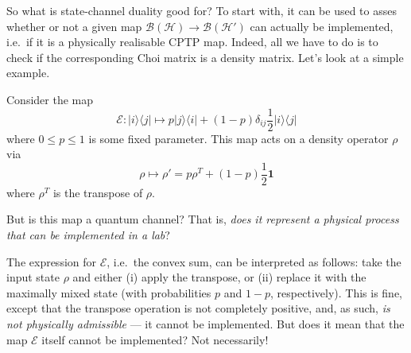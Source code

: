 \documentclass[fleqn]{article}
\begin{document}
So what is state-channel duality good for?
To start with, it can be used to asses whether or not a given map \(\mathcal{B}(\mathcal{H})\to\mathcal{B}(\mathcal{H}')\) can actually be implemented, i.e.~if it is a physically realisable CPTP map.
Indeed, all we have to do is to check if the corresponding Choi matrix is a density matrix.
Let's look at a simple example.

Consider the map
\[
  \mathcal{E}\colon |i\rangle\langle j|
  \longmapsto p|j\rangle\langle i|+(1-p)\delta_{ij} \frac{1}{2}|i\rangle\langle j|
\]
where \(0\leqslant p\leqslant 1\) is some fixed parameter.
This map acts on a density operator \(\rho\) via
\[
  \rho
  \longmapsto \rho'
  = p\rho^T +(1-p) \frac{1}{2}\mathbf{1}
\]
where \(\rho^T\) is the transpose of \(\rho\).

But is this map a quantum channel?
That is, \emph{does it represent a physical process that can be implemented in a lab}?

The expression for \(\mathcal{E}\), i.e.~the convex sum, can be interpreted as follows: take the input state \(\rho\) and either (i) apply the transpose, or (ii) replace it with the maximally mixed state (with probabilities \(p\) and \(1-p\), respectively).
This is fine, except that the transpose operation is not completely positive, and, as such, \emph{is not physically admissible} --- it cannot be implemented.
But does it mean that the map \(\mathcal{E}\) itself cannot be implemented?
Not necessarily!
\end{document}
